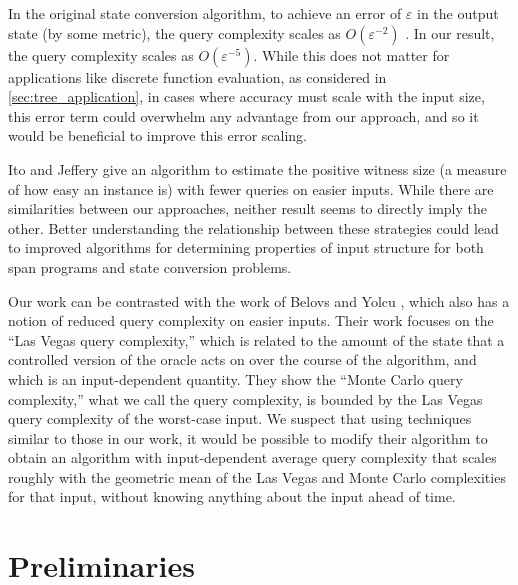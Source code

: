 \documentclass[cleveref, autoref, thm-restate,11pt]{article}
\theoremstyle{definition}
\begin{document}
In the original state conversion algorithm, to achieve an error of
$\varepsilon$ in the output state (by some metric), the query complexity
scales as $O\left(\varepsilon^{-2}\right)$ \cite{leeQuantumQueryComplexity2011}. In our result, the query
complexity scales as $O\left(\varepsilon^{-5}\right)$. While this does not
matter for applications like discrete function evaluation, as considered in \cref{sec:tree_application}, in cases where
accuracy must scale with the input size, this error term could overwhelm any
advantage from our approach, and so it would be beneficial to improve this
error scaling.


Ito and Jeffery
\cite{itoApproximateSpanPrograms2019} give an algorithm to estimate the positive witness size
(a measure of how easy an instance is) with fewer queries on easier inputs. While there are similarities between
our approaches, neither result seems to directly imply the other. Better
understanding the relationship between these strategies could lead to
improved algorithms for determining properties of input structure for both
span programs and state conversion problems.

Our work can be contrasted with the work of Belovs and Yolcu 
\cite{belovs2023one}, which also has a notion of reduced query complexity on
easier inputs.  Their 
work focuses on the ``Las Vegas query complexity,'' which is
related to the amount of the state that
a controlled version of the oracle acts on over the course of the algorithm,
and which is an input-dependent quantity. They show the ``Monte Carlo query complexity,'' what we call the query complexity, is bounded by the Las Vegas query complexity of the worst-case input. 
We suspect that using techniques similar to those in our work, it would 
be possible to modify their algorithm
to obtain an algorithm with input-dependent average
query complexity 
that scales roughly with the geometric mean of the Las Vegas and Monte Carlo
complexities for that input, without
knowing anything about the input ahead of time.



\section{Preliminaries}\label{sec:Prelims}
\end{document}
